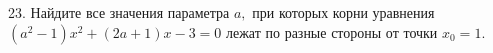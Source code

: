 23. Найдите все значения параметра $a,$ при которых корни уравнения $(a^2-1)x^2+(2a+1)x-3=0$ лежат по разные стороны от точки $x_0=1.$\\
